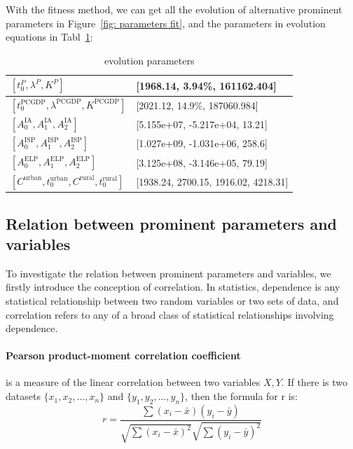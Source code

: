    With the fitness method, we can get all the evolution of alternative prominent parameters in Figure~\ref{fig: parameters fit}, and the parameters in evolution equations in Tabl~\ref{tab: evolution par}:
    \begin{table}[!h]
      \centering
      \begin{tabular}{|l|l|}
      \hline
      $\left[t_0^P, \lambda^P,K^P\right]$ & [1968.14, 3.94\%, 161162.404] \\
      \hline
      $\left[t_0^\text{PCGDP}, \lambda^\text{PCGDP},K^\text{PCGDP}\right]$ & [2021.12, 14.9\%, 187060.984] \\
      \hline
      $\left[A_0^\text{IA},A_1^\text{IA},A_2^\text{IA}\right]$ & [5.155e+07, -5.217e+04, 13.21] \\
      \hline
      $\left[A_0^\text{ISP},A_1^\text{ISP},A_2^\text{ISP}\right]$ & [1.027e+09, -1.031e+06, 258.6] \\
      \hline
      $\left[A_0^\text{ELP},A_1^\text{ELP},A_2^\text{ELP}\right]$ & [3.125e+08, -3.146e+05, 79.19] \\
      \hline
      $\left[C^\text{urban},t_0^\text{urban},C^\text{rural},t_0^\text{rural}\right]$ & [1938.24, 2700.15, 1916.02, 4218.31] \\
      \hline
      \end{tabular}
      \caption{evolution parameters}
      \label{tab: evolution par}
    \end{table}


  \subsection{Relation between prominent parameters and variables}
    To investigate the relation between prominent parameters and variables, we firstly introduce the conception of  correlation. In statistics, dependence is any statistical relationship between two random variables or two sets of data, and correlation refers to any of a broad class of statistical relationships involving dependence.


    \paragraph{Pearson product-moment correlation coefficient}\cite{Pearson} is a measure of the linear correlation between two variables $X, Y$. If there is two datasets $\{x_1,x_2,\dots, x_n\}$ and $\{y_1,y_2,\dots, y_n\}$, then the formula for r is\cite{pearsonr}:
    $$
    r = \frac{\sum{(x_i-\bar{x})(y_i-\bar{y})}}{\sqrt{\sum{(x_i-\bar{x})^2}}\sqrt{\sum{(y_i-\bar{y})^2}}}
    $$

